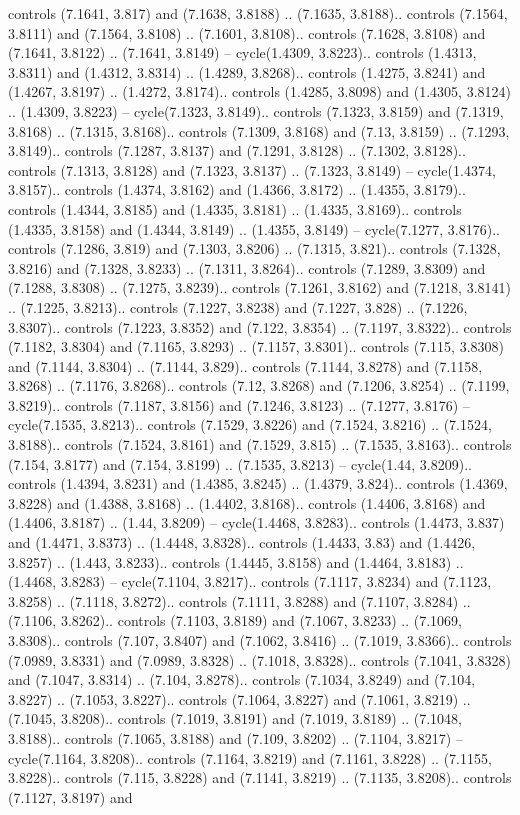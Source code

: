 controls (7.1641, 3.817) and (7.1638, 3.8188) .. (7.1635, 3.8188).. controls (7.1564, 3.8111) and (7.1564, 3.8108) .. (7.1601, 3.8108).. controls (7.1628, 3.8108) and (7.1641, 3.8122) .. (7.1641, 3.8149) -- cycle(1.4309, 3.8223).. controls (1.4313, 3.8311) and (1.4312, 3.8314) .. (1.4289, 3.8268).. controls (1.4275, 3.8241) and (1.4267, 3.8197) .. (1.4272, 3.8174).. controls (1.4285, 3.8098) and (1.4305, 3.8124) .. (1.4309, 3.8223) -- cycle(7.1323, 3.8149).. controls (7.1323, 3.8159) and (7.1319, 3.8168) .. (7.1315, 3.8168).. controls (7.1309, 3.8168) and (7.13, 3.8159) .. (7.1293, 3.8149).. controls (7.1287, 3.8137) and (7.1291, 3.8128) .. (7.1302, 3.8128).. controls (7.1313, 3.8128) and (7.1323, 3.8137) .. (7.1323, 3.8149) -- cycle(1.4374, 3.8157).. controls (1.4374, 3.8162) and (1.4366, 3.8172) .. (1.4355, 3.8179).. controls (1.4344, 3.8185) and (1.4335, 3.8181) .. (1.4335, 3.8169).. controls (1.4335, 3.8158) and (1.4344, 3.8149) .. (1.4355, 3.8149) -- cycle(7.1277, 3.8176).. controls (7.1286, 3.819) and (7.1303, 3.8206) .. (7.1315, 3.821).. controls (7.1328, 3.8216) and (7.1328, 3.8233) .. (7.1311, 3.8264).. controls (7.1289, 3.8309) and (7.1288, 3.8308) .. (7.1275, 3.8239).. controls (7.1261, 3.8162) and (7.1218, 3.8141) .. (7.1225, 3.8213).. controls (7.1227, 3.8238) and (7.1227, 3.828) .. (7.1226, 3.8307).. controls (7.1223, 3.8352) and (7.122, 3.8354) .. (7.1197, 3.8322).. controls (7.1182, 3.8304) and (7.1165, 3.8293) .. (7.1157, 3.8301).. controls (7.115, 3.8308) and (7.1144, 3.8304) .. (7.1144, 3.829).. controls (7.1144, 3.8278) and (7.1158, 3.8268) .. (7.1176, 3.8268).. controls (7.12, 3.8268) and (7.1206, 3.8254) .. (7.1199, 3.8219).. controls (7.1187, 3.8156) and (7.1246, 3.8123) .. (7.1277, 3.8176) -- cycle(7.1535, 3.8213).. controls (7.1529, 3.8226) and (7.1524, 3.8216) .. (7.1524, 3.8188).. controls (7.1524, 3.8161) and (7.1529, 3.815) .. (7.1535, 3.8163).. controls (7.154, 3.8177) and (7.154, 3.8199) .. (7.1535, 3.8213) -- cycle(1.44, 3.8209).. controls (1.4394, 3.8231) and (1.4385, 3.8245) .. (1.4379, 3.824).. controls (1.4369, 3.8228) and (1.4388, 3.8168) .. (1.4402, 3.8168).. controls (1.4406, 3.8168) and (1.4406, 3.8187) .. (1.44, 3.8209) -- cycle(1.4468, 3.8283).. controls (1.4473, 3.837) and (1.4471, 3.8373) .. (1.4448, 3.8328).. controls (1.4433, 3.83) and (1.4426, 3.8257) .. (1.443, 3.8233).. controls (1.4445, 3.8158) and (1.4464, 3.8183) .. (1.4468, 3.8283) -- cycle(7.1104, 3.8217).. controls (7.1117, 3.8234) and (7.1123, 3.8258) .. (7.1118, 3.8272).. controls (7.1111, 3.8288) and (7.1107, 3.8284) .. (7.1106, 3.8262).. controls (7.1103, 3.8189) and (7.1067, 3.8233) .. (7.1069, 3.8308).. controls (7.107, 3.8407) and (7.1062, 3.8416) .. (7.1019, 3.8366).. controls (7.0989, 3.8331) and (7.0989, 3.8328) .. (7.1018, 3.8328).. controls (7.1041, 3.8328) and (7.1047, 3.8314) .. (7.104, 3.8278).. controls (7.1034, 3.8249) and (7.104, 3.8227) .. (7.1053, 3.8227).. controls (7.1064, 3.8227) and (7.1061, 3.8219) .. (7.1045, 3.8208).. controls (7.1019, 3.8191) and (7.1019, 3.8189) .. (7.1048, 3.8188).. controls (7.1065, 3.8188) and (7.109, 3.8202) .. (7.1104, 3.8217) -- cycle(7.1164, 3.8208).. controls (7.1164, 3.8219) and (7.1161, 3.8228) .. (7.1155, 3.8228).. controls (7.115, 3.8228) and (7.1141, 3.8219) .. (7.1135, 3.8208).. controls (7.1127, 3.8197) and 